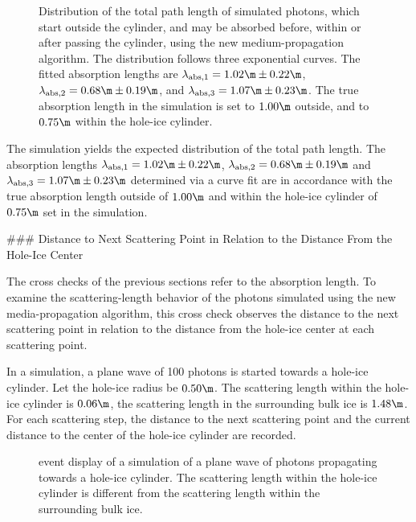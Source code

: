 \begin{figure}
  \caption{Distribution of the total path length of simulated photons, which start outside the cylinder, and may be absorbed before, within or after passing the cylinder, using the new medium-propagation algorithm. The distribution follows three exponential curves. The fitted absorption lengths are $\lambda_\text{abs,1} = 1.02\m \pm 0.22\m$, $\lambda_\text{abs,2} = 0.68\m \pm 0.19\m$, and $\lambda_\text{abs,3} = 1.07\m \pm 0.23\m$. The true absorption length in the simulation is set to $1.00\m$ outside, and to $0.75\m$ within the hole-ice cylinder.}
\end{figure}

The simulation yields the expected distribution of the total path length. The absorption lengths $\lambda_\text{abs,1} = 1.02\m \pm 0.22\m$, $\lambda_\text{abs,2} = 0.68\m \pm 0.19\m$ and $\lambda_\text{abs,3} = 1.07\m \pm 0.23\m$ determined via a curve fit are in accordance with the true absorption length outside of $1.00\m$ and within the hole-ice cylinder of $0.75\m$ set in the simulation.


### Distance to Next Scattering Point in Relation to the Distance From the Hole-Ice Center
\label{sec:cross_check_71}


The cross checks of the previous sections refer to the absorption length. To examine the scattering-length behavior of the photons simulated using the new media-propagation algorithm, this cross check observes the distance to the next scattering point in relation to the distance from the hole-ice center at each scattering point.

In a simulation, a plane wave of 100 photons is started towards a hole-ice cylinder. Let the hole-ice radius be $0.50\m$. The scattering length within the hole-ice cylinder is $0.06\m$, the scattering length in the surrounding bulk ice is $1.48\m$.
For each scattering step, the distance to the next scattering point and the current distance to the center of the hole-ice cylinder are recorded.


\begin{figure}[htbp]
  \caption{\steamshovel event display of a simulation of a plane wave of photons propagating towards a hole-ice cylinder. The scattering length within the hole-ice cylinder is different from the scattering length within the surrounding bulk ice.}
  \label{fig:An7ik8pu}
\end{figure}


